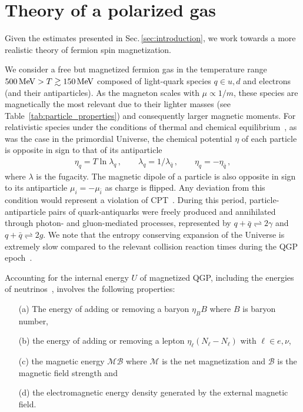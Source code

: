 \documentclass[epjST]{svjour}
\newcommand*{\MeV}{\text{\,MeV}}
\newcommand{\rsec}[1]{Sec.\,{\ref{#1}}}
\begin{document}
{\color{blue}\section{Theory of a polarized gas}
\label{sec:magnetization}
Given the estimates presented in \rsec{sec:introduction}, we work towards a more realistic theory of fermion spin magnetization.} We consider a free but magnetized fermion gas in the temperature range \(500\MeV>T\gtrsim150\MeV\) composed of light-quark species \(q \in {u,d}\) and electrons (and their antiparticles). As the magneton scales with \(\mu \propto 1/m\), these species are magnetically the most relevant due to their lighter masses (see Table~\ref{tab:particle_properties}) and consequently larger magnetic moments. For relativistic species under the conditions of thermal and chemical equilibrium~\cite{Elze:1980er}, as was the case in the primordial Universe, the chemical potential \(\eta\) of each particle is opposite in sign to that of its antiparticle
\begin{align}
\label{eq:equilibirum_conditions}
\eta_{q}=T\ln\lambda_{q}\,,\qquad
\lambda_{q}=1/\lambda_{\bar{q}}\,,\qquad
\eta_{q}=-\eta_{\bar{q}}\,,
\end{align}
where \(\lambda\) is the fugacity. The magnetic dipole of a particle is also opposite in sign to its antiparticle $\mu_{i}=-\mu_{\bar{i}}$ as charge is flipped. Any deviation from this condition would represent a violation of CPT~\cite{Colladay:1996iz,Bluhm:1997ci,BASE:2016yuo}. During this period, particle-antiparticle pairs of quark-antiquarks were freely produced and annihilated through photon- and gluon-mediated processes, represented by \(q+\bar{q}\rightleftharpoons2\gamma\) and \(q+\bar{q}\rightleftharpoons2g\). We note that the entropy conserving expansion of the Universe is extremely slow compared to the relevant collision reaction times during the QGP epoch~\cite{Yang:2024ret}.

Accounting for the internal energy $U$ of magnetized QGP, including the energies of neutrinos~\cite{Birrell:2014ona}, involves the following properties: 
\begin{itemize}
\item[(a)] The energy of adding or removing a baryon $\eta_{B}B$ where \(B\) is baryon number,
\item[(b)] the energy of adding or removing a lepton $\eta_{\ell}(N_{\ell}-N_{\ell})$ with $\ell\in {e,\nu}$, 
\item[(c)] the magnetic energy $\mathcal{M}\mathcal{B}$ where $\mathcal{M}$ is the net magnetization and $\mathcal{B}$ is the magnetic field strength and
\item[(d)] the electromagnetic energy density generated by the external magnetic field.
\end{itemize}
\end{document}
